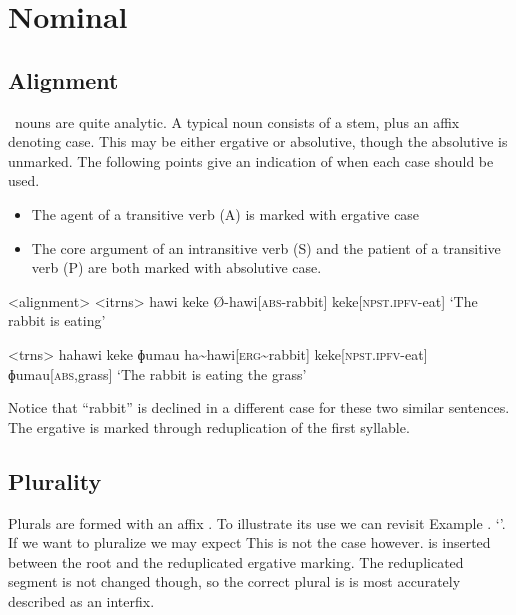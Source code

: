 \chapter{Nominal}
\section{Alignment}

\langname\ nouns are quite analytic. A typical noun consists of a stem, plus an affix denoting case. This may be either ergative or absolutive, though the absolutive is unmarked. The following points give an indication of when each case should be used.
\begin{itemize}
  \item The agent of a transitive verb (A) is marked with ergative case
  \item The core argument of an intransitive verb (S) and the patient of a transitive verb (P) are both marked with absolutive case.
\end{itemize}

\pex<alignment>
\a<itrns>
\begingl
\glpreamble hawi keke
\endpreamble
Ø-hawi[\textsc{abs-}rabbit]
keke[\textsc{npst.ipfv-}eat]
\glft `The rabbit is eating'
\endgl

\a<trns>
\begingl
\glpreamble hahawi keke ɸumau
\endpreamble
ha\textasciitilde hawi[\textsc{erg\textasciitilde}rabbit]
keke[\textsc{npst.ipfv-}eat]
ɸumau[\textsc{abs,}grass]
\glft `The rabbit is eating the grass'
\endgl
\xe

Notice that ``rabbit'' is declined in a different case for these two similar sentences. The ergative is marked through reduplication of the first syllable.

\section{Plurality}

Plurals are formed with an affix . To illustrate its use we can revisit Example . `'. If we want to pluralize  we may expect  This is not the case however.  is inserted between the root and the reduplicated ergative marking. The reduplicated segment is not changed though, so the correct plural is   is most accurately described as an interfix.

